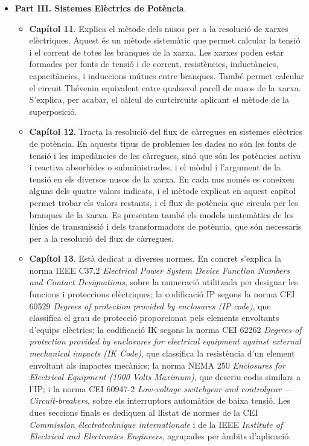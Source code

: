 \begin{itemize}
\begin{itemize}
		\end{itemize}
		\item \textbf{Part III. Sistemes Elèctrics de Potència}. 
		\begin{itemize}
			\item \textbf{Capítol 11}. Explica el mètode dels nusos per a la resolució de xarxes elèctriques. Aquest és un mètode sistemàtic que permet calcular la tensió i el corrent de totes les branques de la xarxa. Les xarxes poden estar  formades per fonts de tensió i de corrent, resistències, inductàncies, capacitàncies, i induccions mútues entre branques. També permet calcular el circuit Thévenin equivalent entre qualsevol parell de nusos de la xarxa. S'explica, per acabar, el càlcul de curtcircuits aplicant el mètode de la superposició.
			\item \textbf{Capítol 12}. Tracta la resolució del  flux de càrregues en sistemes 	elèctrics de potència. En aquests tipus de problemes les dades no són les fonts de tensió i les impedàncies de les càrregues, sinó que són les potències activa i reactiva absorbides o subministrades, i el mòdul i l'argument de la tensió en els diversos nusos de la xarxa. En cada nus només es coneixen alguns dels quatre valors indicats, i el mètode explicat en aquest capítol permet trobar els valors restants, i el flux de potència que circula per les branques de la xarxa. Es presenten també els models matemàtics de les línies de transmissió i dels transformadors de potència, que són necessaris per a la resolució del flux de càrregues.
			\item \textbf{Capítol 13}. Està dedicat a  diverses normes. En concret s'explica la norma IEEE C37.2 \textit{Electrical Power System Device Function Numbers and Contact Designations}, sobre la numeració utilitzada per designar les funcions i proteccions elèctriques; la codificació IP segons la norma CEI 60529 \textit{Degrees of protection provided by enclosures (IP code)}, que classifica el grau de protecció proporcionat pels 			elements envoltants d’equips elèctrics; la codificació IK segons  la norma CEI 62262 \textit{Degrees of protection provided by enclosures for 			electrical equipment against external mechanical impacts (IK Code)}, que  classifica la resistència d’un
			element envoltant als impactes mecànics; la norma
			NEMA 250 \textit{Enclosures for Electrical Equipment (1000 Volts Maximum)}, que descriu codis similars a l'IP; i la norma CEI 60947-2 \textit{Low-voltage switchgear and controlgear --- Circuit-breakers}, sobre els interruptors automàtics de baixa tensió. Les dues seccions finals es dediquen al llistat de normes de la CEI \textit{Commission électrotechnique internationale} i de la IEEE \textit{Institute of Electrical and Electronics Engineers}, agrupades per àmbits d'aplicació.

\end{itemize}
\end{itemize}
